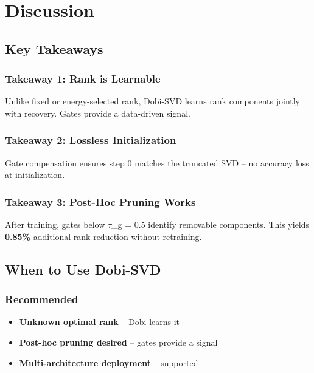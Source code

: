 
\section{Discussion}

\subsection{Key Takeaways}

\subsubsection{Takeaway 1: Rank is Learnable}

Unlike fixed or energy-selected rank, Dobi-SVD learns rank components 
jointly with recovery. Gates provide a data-driven signal.

\subsubsection{Takeaway 2: Lossless Initialization}

Gate compensation ensures step 0 matches the truncated SVD -- no accuracy 
loss at initialization.

\subsubsection{Takeaway 3: Post-Hoc Pruning Works}

After training, gates below $\tau$\_g = 0.5 identify removable components. This 
yields \textbf{0.85\%} additional rank reduction without retraining.

\subsection{When to Use Dobi-SVD}

\subsubsection{Recommended}

\begin{itemize}
\item \textbf{Unknown optimal rank} -- Dobi learns it
\item \textbf{Post-hoc pruning desired} -- gates provide a signal
\item \textbf{Multi-architecture deployment} -- supported

\end{itemize}
